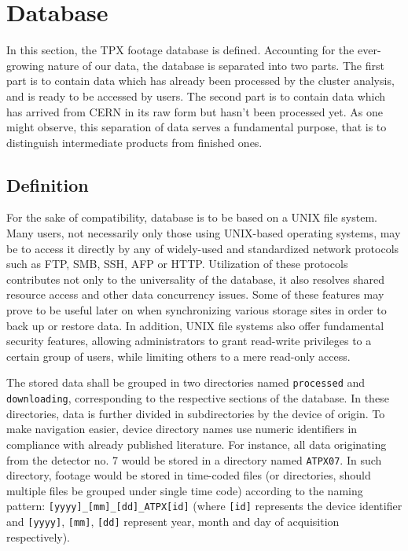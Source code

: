 \section{Database}
\label{db:definition}
In this section, the TPX footage database is defined. Accounting for the ever-growing nature of our data, the database is separated into two parts. The first part is to contain data which has already been processed by the cluster analysis, and is ready to be accessed by users. The second part is to contain data which has arrived from CERN in its raw form but hasn't been processed yet. As one might observe, this separation of data serves a fundamental purpose, that is to distinguish intermediate products from finished ones.


\subsection{Definition}
For the sake of compatibility, database is to be based on a UNIX file system. Many users, not necessarily only those using UNIX-based operating systems, may be to access it directly by any of widely-used and standardized network protocols such as FTP, SMB, SSH, AFP or HTTP\label{db:supported-protocols}. Utilization of these protocols contributes not only to the universality of the database, it also resolves shared resource access and other data concurrency issues. Some of these features may prove to be useful later on when synchronizing various storage sites in order to back up or restore data. In addition, UNIX file systems also offer fundamental security features, allowing administrators to grant read-write privileges to a certain group of users, while limiting others to a mere read-only access.

The stored data shall be grouped in two directories named \texttt{processed} and \texttt{downloading}, corresponding to the respective sections of the database. In these directories, data is further divided in subdirectories by the device of origin. To make navigation easier, device directory names use numeric identifiers in compliance with already published literature. For instance, all data originating from the detector no. 7 would be stored in a directory named \texttt{ATPX07}. In such directory, footage would be stored in time-coded files (or directories, should multiple files be grouped under single time code) according to the naming pattern: \texttt{[yyyy]\_[mm]\_[dd]\_ATPX[id]} (where \texttt{[id]} represents the device identifier and \texttt{[yyyy]}, \texttt{[mm]}, \texttt{[dd]} represent year, month and day of acquisition respectively).

